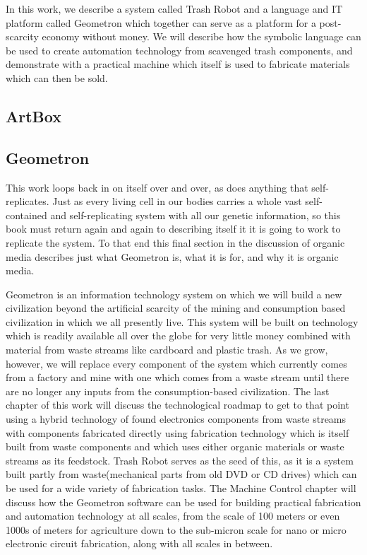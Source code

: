 In this work, we describe a system called Trash Robot and a language and IT platform called Geometron which together can serve as a platform for a post-scarcity economy without money.  We will describe how the symbolic language can be used to create automation technology from scavenged trash components, and demonstrate with a practical machine which itself is used to fabricate materials which can then be sold.  

\subsection{ArtBox}

\subsection{Geometron}

This work loops back in on itself over and over, as does anything that self-replicates.  Just as every living cell in our bodies carries a whole vast self-contained and self-replicating system with all our genetic information, so this book must return again and again to describing itself it it is going to work to replicate the system.  To that end this final section in the discussion of organic media describes just what Geometron is, what it is for, and why it is organic media.

Geometron is an information technology system on which we will build a new civilization beyond the artificial scarcity of the mining and consumption based civilization in which we all presently live.  This system will be built on technology which is readily available all over the globe for very little money combined with material from waste streams like cardboard and plastic trash. As we grow, however, we will replace every component of the system which currently comes from a factory and mine with one which comes from a waste stream until there are no longer any inputs from the consumption-based civilization.  The last chapter of this work will discuss the technological roadmap to get to that point using a hybrid technology of found electronics components from waste streams with components fabricated directly using fabrication technology which is itself built from waste components and which uses either organic materials or waste streams as its feedstock.  Trash Robot serves as the seed of this, as it is a system built partly from waste(mechanical parts from old DVD or CD drives) which can be used for a wide variety of fabrication tasks.  The Machine Control chapter will discuss how the Geometron software can be used for building practical fabrication and automation technology at all scales, from the scale of 100 meters or even 1000s of meters for agriculture down to the sub-micron scale for nano or micro electronic circuit fabrication, along with all scales in between.  

